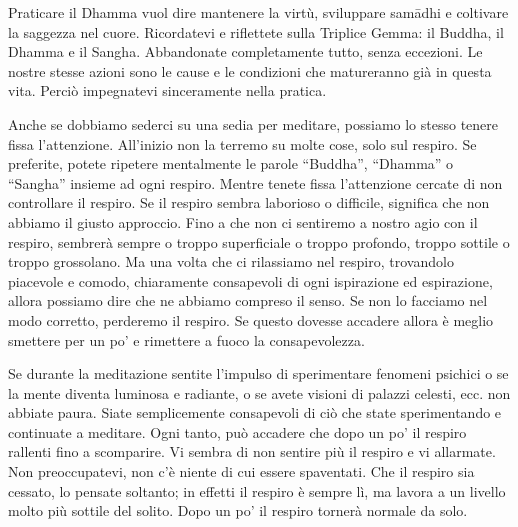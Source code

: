 Praticare il Dhamma vuol dire mantenere la virtù, sviluppare samādhi e
coltivare la saggezza nel cuore. Ricordatevi e riflettete sulla Triplice
Gemma: il Buddha, il Dhamma e il Sangha. Abbandonate completamente
tutto, senza eccezioni. Le nostre stesse azioni sono le cause e le
condizioni che matureranno già in questa vita. Perciò impegnatevi
sinceramente nella pratica.

Anche se dobbiamo sederci su una sedia per meditare, possiamo lo stesso
tenere fissa l'attenzione. All'inizio non la terremo su molte cose, solo
sul respiro. Se preferite, potete ripetere mentalmente le parole
``Buddha'', ``Dhamma'' o ``Sangha'' insieme ad ogni respiro. Mentre
tenete fissa l'attenzione cercate di non controllare il respiro. Se il
respiro sembra laborioso o difficile, significa che non abbiamo il
giusto approccio. Fino a che non ci sentiremo a nostro agio con il
respiro, sembrerà sempre o troppo superficiale o troppo profondo, troppo
sottile o troppo grossolano. Ma una volta che ci rilassiamo nel respiro,
trovandolo piacevole e comodo, chiaramente consapevoli di ogni
ispirazione ed espirazione, allora possiamo dire che ne abbiamo compreso
il senso. Se non lo facciamo nel modo corretto, perderemo il respiro. Se
questo dovesse accadere allora è meglio smettere per un po' e rimettere
a fuoco la consapevolezza.

Se durante la meditazione sentite l'impulso di sperimentare fenomeni
psichici o se la mente diventa luminosa e radiante, o se avete visioni
di palazzi celesti, ecc. non abbiate paura. Siate semplicemente
consapevoli di ciò che state sperimentando e continuate a meditare. Ogni
tanto, può accadere che dopo un po' il respiro rallenti fino a
scomparire. Vi sembra di non sentire più il respiro e vi allarmate. Non
preoccupatevi, non c'è niente di cui essere spaventati. Che il respiro
sia cessato, lo pensate soltanto; in effetti il respiro è sempre lì, ma
lavora a un livello molto più sottile del solito. Dopo un po' il respiro
tornerà normale da solo.

